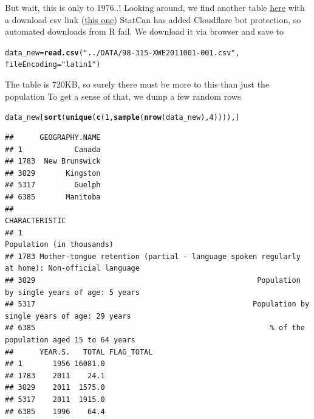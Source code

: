 \documentclass[aspectratio=169]{beamer}\usepackage[]{graphicx}\usepackage[]{xcolor}
\makeatletter
\newcommand{\hlnum}[1]{\textcolor[rgb]{0.686,0.059,0.569}{#1}}%
\newcommand{\hlsng}[1]{\textcolor[rgb]{0.192,0.494,0.8}{#1}}%
\newcommand{\hldef}[1]{\textcolor[rgb]{0.345,0.345,0.345}{#1}}%
\newcommand{\hlkwb}[1]{\textcolor[rgb]{0.69,0.353,0.396}{#1}}%
\newcommand{\hlkwc}[1]{\textcolor[rgb]{0.333,0.667,0.333}{#1}}%
\newcommand{\hlkwd}[1]{\textcolor[rgb]{0.737,0.353,0.396}{\textbf{#1}}}%
\newenvironment{kframe}{%
 \def\at@end@of@kframe{}%
 \ifinner\ifhmode%
  \def\at@end@of@kframe{\end{minipage}}%
  \begin{minipage}{\columnwidth}%
 \fi\fi%
 \def\FrameCommand##1{\hskip\@totalleftmargin \hskip-\fboxsep
 \colorbox{shadecolor}{##1}\hskip-\fboxsep
     \hskip-\linewidth \hskip-\@totalleftmargin \hskip\columnwidth}%
 \MakeFramed {\advance\hsize-\width
   \@totalleftmargin\z@ \linewidth\hsize
   \@setminipage}}%
 {\par\unskip\endMakeFramed%
 \at@end@of@kframe}
\newenvironment{knitrout}{}{} %
\makeatother
\begin{document}
\begin{frame}[fragile]
But wait, this is only to 1976..! 
\vfill
Looking around, we find another table \href{https://www12.statcan.gc.ca/census-recensement/2011/dp-pd/vc-rv/index.cfm?LANG=ENG&VIEW=D&TOPIC_ID=1&GEOCODE=01&CFORMAT=html}{here} with a download csv link (\href{https://www12.statcan.gc.ca/census-recensement/2011/dp-pd/vc-rv/download-telecharger/download-telecharger.cfm?Lang=eng&CTLG=98-315-XWE2011001&FMT=csv}{this one})
\vfill
StatCan has added Cloudflare bot protection, so automated downloads from R fail. We download it via browser and save to 
\begin{knitrout}
\color{fgcolor}\begin{kframe}
\begin{alltt}
\hldef{data_new} \hlkwb{=} \hlkwd{read.csv}\hldef{(}\hlsng{"../DATA/98-315-XWE2011001-001.csv"}\hldef{,}
                    \hlkwc{fileEncoding} \hldef{=} \hlsng{"latin1"}\hldef{)}
\end{alltt}
\end{kframe}
\end{knitrout}
The table is 720KB, so surely there must be more to this than just the population
\vfill
To get a sense of that, we dump a few random rows
\end{frame}

\begin{frame}[fragile]
\begin{knitrout}
\color{fgcolor}\begin{kframe}
\begin{alltt}
\hldef{data_new[}\hlkwd{sort}\hldef{(}\hlkwd{unique}\hldef{(}\hlkwd{c}\hldef{(}\hlnum{1}\hldef{,}\hlkwd{sample}\hldef{(}\hlkwd{nrow}\hldef{(data_new),} \hlnum{4}\hldef{)))), ]}
\end{alltt}
\begin{verbatim}
##      GEOGRAPHY.NAME
## 1            Canada
## 1783  New Brunswick
## 3829       Kingston
## 5317         Guelph
## 6385       Manitoba
##                                                                                    CHARACTERISTIC
## 1                                                                       Population (in thousands)
## 1783 Mother-tongue retention (partial - language spoken regularly at home): Non-official language
## 3829                                                   Population by single years of age: 5 years
## 5317                                                  Population by single years of age: 29 years
## 6385                                                      % of the population aged 15 to 64 years
##      YEAR.S.   TOTAL FLAG_TOTAL
## 1       1956 16081.0           
## 1783    2011    24.1           
## 3829    2011  1575.0           
## 5317    2011  1915.0           
## 6385    1996    64.4
\end{verbatim}
\end{kframe}
\end{knitrout}
\end{frame}
\end{document}
